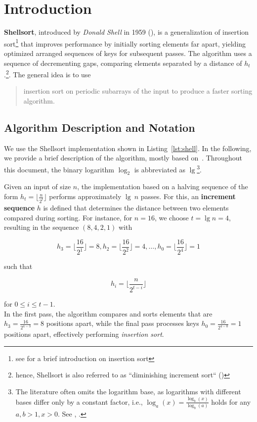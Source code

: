 \section{Introduction}

\textbf{Shellsort}, introduced by \textit{Donald Shell} in 1959 (\cite[]{She59}), is a generalization of insertion sort\footnote{
see \cite[250]{SW11} for a brief introduction on insertion sort
} that improves performance by initially sorting elements far apart, yielding optimized arranged sequences of keys for subsequent passes.
The algorithm uses a sequence of decrementing gaps, comparing elements separated by a distance of $h_t$.\footnote{
hence, Shellsort is also referred to as ``diminishing increment sort`` (\cite[88]{OW17b})
}.
The general idea is to use \blockquote[{\cite[48]{CL22}}]{
    insertion sort on periodic subarrays of the input
    to produce a faster sorting algorithm.
}

\subsection{Algorithm Description and Notation}
We use the Shellsort implementation shown in Listing~\ref{lst:shell}.
In the following, we provide a brief description of the algorithm, mostly based on~\cite[84]{Knu97b}.
Throughout this document, the binary logarithm $\log_2$ is abbreviated as $\lg$\footnote{
    The literature often omits the logarithm base, as logarithms with different bases differ only by a constant factor, i.e., $ \log_a(x) = \frac{\log_b(x)}{\log_b(a)} $ holds for any $a, b > 1, x > 0$. See \cite[15]{GD18a}, \cite[5]{OW17a}.
}.


Given an input of size $n$, the implementation based on a halving sequence of the form $h_t = \lfloor \frac{n}{2^t} \rfloor$ performs approximately $\lg\ n$ passes.
For this, an \textbf{increment sequence} $h$ is defined that determines the distance between two elements compared during sorting.
For instance, for $n = 16$, we choose $t=\lg n = 4$, resulting in the sequence $(8, 4, 2, 1)$ with

\[
    h_{3} = \lfloor\frac{16}{2^1}\rfloor = 8, h_{2} = \lfloor\frac{16}{2^2}\rfloor = 4, \ldots , h_{0} = \lfloor\frac{16}{2^4}\rfloor = 1
\]

such that

\[
    h_i = \lfloor {\frac{n}{2^{t-i}}} \rfloor
\]

for $0 \leq i \leq t - 1$.\\

In the first pass, the algorithm compares and sorts elements that are $h_{3} = \frac{16}{2^{4-3}} = 8$ positions apart, while the final pass processes keys $h_0 = \frac{16}{2^{4-0}} = 1$ positions apart, effectively performing \textit{insertion sort}.\\

